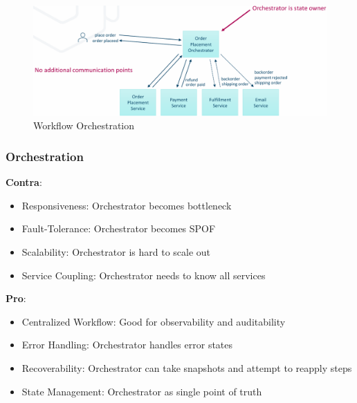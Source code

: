 \documentclass[../Main.tex]{subfiles}
\begin{document}
\begin{figure}[H]
    \centering
    \includegraphics[width=1\linewidth]{Images/workflow-orchestration.png}
    \caption{Workflow Orchestration}
\end{figure}

\newpage
\subsubsection{Orchestration}
\begin{multicols}{2}
    \textbf{Contra}:
    \begin{itemize}
        \item Responsiveness: Orchestrator becomes bottleneck
        \item Fault-Tolerance: Orchestrator becomes SPOF
        \item Scalability: Orchestrator is hard to scale out
        \item Service Coupling: Orchestrator needs to know all services
    \end{itemize}
    \columnbreak
    \textbf{Pro}:
    \begin{itemize}
        \item Centralized Workflow: Good for observability and auditability
        \item Error Handling: Orchestrator handles error states
        \item Recoverability: Orchestrator can take snapshots and attempt to reapply steps
        \item State Management: Orchestrator as single point of truth
    \end{itemize}
\end{multicols}
\end{document}
